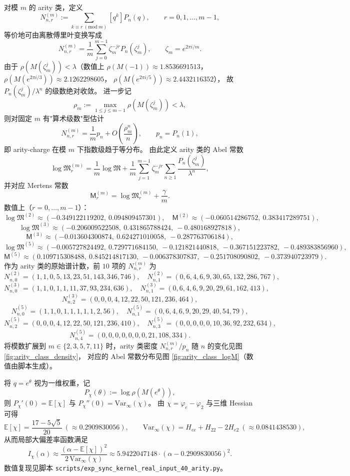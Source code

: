对模 $m$ 的 arity 类，定义
\[
N_{n,r}^{(m)}:=\sum_{k\equiv r\ (\mathrm{mod}\ m)}[q^k]P_n(q),
\qquad r=0,1,\dots,m-1,
\]
等价地可由离散傅里叶变换写成
\[
N_{n,r}^{(m)}=\frac{1}{m}\sum_{j=0}^{m-1}\zeta_m^{-jr}P_n(\zeta_m^j),
\qquad \zeta_m=e^{2\pi i/m}.
\]
由于 $\rho(M(\zeta_m^j))<\lambda$（数值上
$\rho(M(-1))\approx 1.8536691513$，
$\rho(M(e^{2\pi i/3}))\approx 2.1262298605$，
$\rho(M(e^{2\pi i/5}))\approx 2.4432116352$），
故 $P_n(\zeta_m^j)/\lambda^n$ 的级数绝对收敛。
进一步记
\[
\rho_m:=\max_{1\le j\le m-1}\rho(M(\zeta_m^j))<\lambda,
\]
则对固定 $m$ 有"算术级数"型估计
\[
N_{n,r}^{(m)}=\frac{1}{m}p_n+O\!\left(\frac{\rho_m^n}{n}\right),
\qquad p_n=P_n(1),
\]
即 arity-charge 在模 $m$ 下指数级趋于等分布。
由此定义 arity 类的 Abel 常数
\[
\log\mathfrak{M}_r^{(m)}
=\frac{1}{m}\log\mathfrak{M}
+\frac{1}{m}\sum_{j=1}^{m-1}\zeta_m^{-jr}\sum_{n\ge 1}\frac{P_n(\zeta_m^j)}{\lambda^n},
\]
并对应 Mertens 常数
\[
\mathsf{M}_r^{(m)}=\log\mathfrak{M}_r^{(m)}+\frac{\gamma}{m}.
\]
数值上（$r=0,\dots,m-1$）：
\[
\log\mathfrak{M}^{(2)}\approx(-0.349122119202,\ 0.094809457301),
\quad
\mathsf{M}^{(2)}\approx(-0.060514286752,\ 0.383417289751),
\]
\[
\log\mathfrak{M}^{(3)}\approx(-0.206009522508,\ 0.431865788424,\ -0.480168927818),
\]
\[
\mathsf{M}^{(3)}\approx(-0.013604300874,\ 0.624271010058,\ -0.287763706184),
\]
\[
\log\mathfrak{M}^{(5)}\approx(-0.005727824492,\ 0.729771684150,\ -0.121821440818,\ -0.367151223782,\ -0.489383856960),
\]
\[
\mathsf{M}^{(5)}\approx(0.109715308488,\ 0.845214817130,\ -0.006378307837,\ -0.251708090802,\ -0.373940723979).
\]
作为 arity 类的原始谱计数，前 $10$ 项的 $N_{n,r}^{(m)}$ 为
\[
N_{n,0}^{(2)}=(1,1,0,5,13,23,51,143,346,746),\quad
N_{n,1}^{(2)}=(0,6,4,6,9,30,65,132,286,767),
\]
\[
N_{n,0}^{(3)}=(1,1,0,1,1,11,37,93,234,636),\quad
N_{n,1}^{(3)}=(0,6,4,6,9,20,29,61,162,413),
\]
\[
N_{n,2}^{(3)}=(0,0,0,4,12,22,50,121,236,464),
\]
\[
N_{n,0}^{(5)}=(1,1,0,1,1,1,1,1,2,56),\quad
N_{n,1}^{(5)}=(0,6,4,6,9,20,29,40,54,79),
\]
\[
N_{n,2}^{(5)}=(0,0,0,4,12,22,50,121,236,410),\quad
N_{n,3}^{(5)}=(0,0,0,0,0,10,36,92,232,634),
\]
\[
N_{n,4}^{(5)}=(0,0,0,0,0,0,0,21,108,334).
\]
将模数扩展到 $m\in\{2,3,5,7,11\}$ 时，arity 类密度 $N_{n,r}^{(m)}/p_n$ 随 $n$ 的变化见图 \ref{fig:arity_class_density}，
对应的 Abel 常数分布见图 \ref{fig:arity_class_logM}（数值由脚本生成）。


将 $q=e^\theta$ 视为一维权重，记
\[
P_\chi(\theta):=\log\rho(M(e^\theta)),
\]
则 $P_\chi'(0)=\mathbb{E}[\chi]$ 与 $P_\chi''(0)=\mathrm{Var}_\infty(\chi)$。
由 $\chi=\varphi_e-\varphi_2$ 与三维 Hessian 可得
\[
\mathbb{E}[\chi]=\frac{17-5\sqrt5}{20}\ (\approx 0.2909830056),
\qquad
\mathrm{Var}_\infty(\chi)=H_{ee}+H_{22}-2H_{e2}\ (\approx 0.0841438530),
\]
从而局部大偏差率函数满足
\[
I_\chi(\alpha)\approx \frac{(\alpha-\mathbb{E}[\chi])^2}{2\,\mathrm{Var}_\infty(\chi)}
\approx 5.9422047148\cdot(\alpha-0.2909830056)^2.
\]
数值复现见脚本 \texttt{scripts/exp\_sync\_kernel\_real\_input\_40\_arity.py}。

